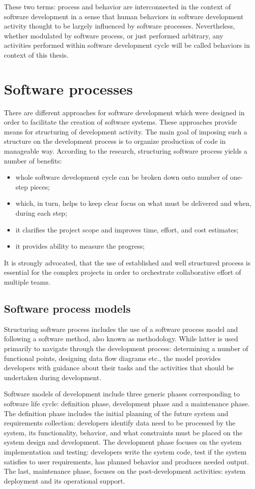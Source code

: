 These two terms: process and behavior are interconnected in the context of software development
in a sense that human behaviors in software development activity thought to be largely influenced 
by software processes. Nevertheless, whether modulated by software process, or just 
performed arbitrary, any activities performed within software development cycle will be called 
behaviors in context of this thesis.

\section{Software processes}\label{software.processes}
There are different approaches for software development which were designed in order to 
facilitate the creation of software systems. These approaches provide means for 
structuring of development activity. The main goal of imposing such a structure on the 
development process is to organize production of code in manageable way. 
According to the research, structuring software process yields a number of benefits:
\begin{itemize}
 \item whole software development cycle can be broken down onto number of one-step pieces;
 \item which, in turn, helps to keep clear focus on what must be delivered and when, during each step;
 \item it clarifies the project scope and improves time, effort, and cost estimates;
 \item it provides ability to measure the progress;
\end{itemize}
It is strongly advocated, that the use of established and well structured process is 
essential for the complex projects in order to orchestrate collaborative effort 
of multiple teams. 

\subsection{Software process models}
Structuring software process includes the use of a software process model and following 
a software method, also known as methodology. While latter is used primarily to navigate 
through the development process: determining a number of functional points, 
designing data flow diagrams etc., the model provides developers with guidance about their 
tasks and the activities that should be undertaken during development. 

Software models of development include three generic phases corresponding to software
life cycle: definition phase, development phase and a maintenance phase. 
The definition phase includes the initial planning of the future system and 
requirements collection: developers identify data need to be processed by the system, 
its functionality, behavior, and what constraints must be placed on the system design 
and development. 
The development phase focuses on the system implementation and testing: developers 
write the system code, test if the system satisfies to user requirements, 
has planned behavior and produces needed output. 
The last, maintenance phase, focuses on the post-development activities: 
system deployment and its operational support. 

